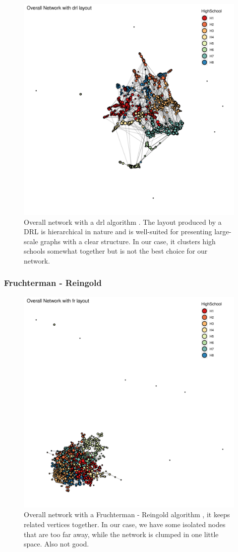     \begin{figure}[h]
        \centering
            \includegraphics[width=0.7\linewidth]{figures/Networks/Layouts/Graph_OverallNetwork_with_no_highlight_drl_HighSchool___drl.png} 
        \caption{Overall network with a \gls{drl} algorithm  \cite{osti_1145621} . The layout produced by a DRL is hierarchical in nature and is well-suited for presenting large-scale graphs with a clear structure. In our case, it clusters high schools somewhat together but is not the best choice for our network.}
        \label{figure:networksLayoutsDRL}
    \end{figure}

\clearpage

\subsubsection{Fruchterman - Reingold}

    \begin{figure}[h]
        \centering
            \includegraphics[width=0.7\linewidth]{figures/Networks/Layouts/Graph_OverallNetwork_with_no_highlight_fr_HighSchool___fr.png} 
        \caption{Overall network with a Fruchterman - Reingold algorithm \cite{Fruchterman1991}, it keeps related vertices together. In our case, we have some isolated nodes that are too far away, while the network is clumped in one little space. Also not good.}
        \label{figure:networksLayoutsFR}
    \end{figure}

